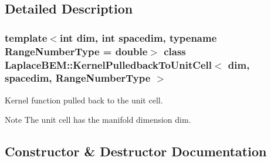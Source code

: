 \subsection{Detailed Description}
\subsubsection*{template$<$int dim, int spacedim, typename Range\+Number\+Type = double$>$\newline
class Laplace\+B\+E\+M\+::\+Kernel\+Pulledback\+To\+Unit\+Cell$<$ dim, spacedim, Range\+Number\+Type $>$}

Kernel function pulled back to the unit cell.


\begin{DoxyDescription}
\item[Note ]The unit cell has the manifold dimension {\ttfamily dim}. 
\end{DoxyDescription}

\subsection{Constructor \& Destructor Documentation}
\mbox{\label{classLaplaceBEM_1_1KernelPulledbackToUnitCell_a344ad653c5e57498cc005b5b683e8db6}} 
